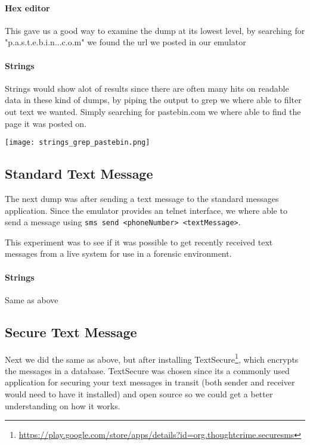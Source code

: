   \paragraph{Hex editor}
  This gave us a good way to examine the dump at its lowest level, by searching for 
  "p.a.s.t.e.b.i.n...c.o.m" we found the url we posted in our emulator

  \paragraph{Strings}
  Strings would show alot of results since there are often many hits on readable 
  data in these kind of dumps, by piping the output to grep we where able to 
  filter out text we wanted. Simply searching for pastebin.com we where able to 
  find the page it was posted on. 
  
  \texttt{[image: strings\_grep\_pastebin.png]}
  
  \subsection{Standard Text Message}
  The next dump was after sending a text message to the standard messages application. 
  Since the emulator provides an telnet interface, we where able to send a message 
  using \texttt{sms send <phoneNumber> <textMessage>}.
  
  This experiment was to see if it was possible to get recently received text 
  messages from a live system for use in a forensic environment.

  \paragraph{Strings}
  Same as above %
  \subsection{Secure Text Message}
  Next we did the same as above, but after installing 
  TextSecure\footnote{\url{https://play.google.com/store/apps/details?id=org.thoughtcrime.securesms}}, 
  which encrypts the messages in a database. TextSecure was chosen since its a commonly 
  used application for securing your text 
  messages in transit (both sender and receiver would need to have it installed) and open source 
  so we could get a better understanding 
  on how it works. 
  
